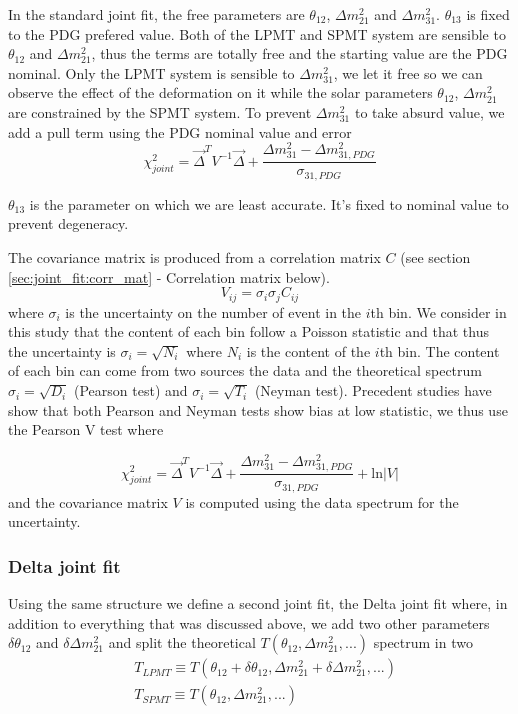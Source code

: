 \documentclass[../main.tex]{subfiles}
\begin{document}
In the standard joint fit, the free parameters are $\theta_{12}$, $\Delta m^2_{21}$ and $\Delta m^2_{31}$. $\theta_{13}$ is fixed to the PDG prefered value. Both of the LPMT and SPMT system are sensible to $\theta_{12}$ and $\Delta m^2_{21}$, thus the terms are totally free and the starting value are the PDG nominal. Only the LPMT system is sensible to $\Delta m^2_{31}$, we let it free so we can observe the effect of the deformation on it while the solar parameters $\theta_{12}$, $\Delta m^2_{21}$ are constrained by the SPMT system. To prevent $\Delta m^2_{31}$ to take absurd value, we add a pull term using the PDG nominal value and error
\begin{equation}
  \chi^2_{joint} = \vec{\Delta}^T V^{-1} \vec{\Delta} + \frac{\Delta m^2_{31} - \Delta m^2_{31,PDG}}{\sigma_{31, PDG}}
\end{equation}

$\theta_{13}$ is the parameter on which we are least accurate. It's fixed to nominal value to prevent degeneracy.

The covariance matrix is produced from a correlation matrix $C$ (see section \ref{sec:joint_fit:corr_mat} - Correlation matrix below).
\begin{equation}
  V_{ij} = \sigma_{i} \sigma_{j} C_{ij}
\end{equation}
where $\sigma_{i}$ is the uncertainty on the number of event in the $i$th bin. We consider in this study that the content of each bin follow a Poisson statistic and that thus the uncertainty is $\sigma_i = \sqrt{N_i}$ where $N_i$ is the content of the $i$th bin. The content of each bin can come from two sources the data and the theoretical spectrum $\sigma_i = \sqrt{D_i}$ (Pearson test) and $\sigma_i = \sqrt{T_i}$ (Neyman test). Precedent studies have show that both Pearson and Neyman tests show bias at low statistic, we thus use the Pearson V test where

\begin{equation}
  \chi^2_{joint} = \vec{\Delta}^T V^{-1} \vec{\Delta} + \frac{\Delta m^2_{31} - \Delta m^2_{31,PDG}}{\sigma_{31, PDG}} + \mathrm{ln} | V |
\end{equation}
and the covariance matrix $V$ is computed using the data spectrum for the uncertainty.

\subsubsection{Delta joint fit}

Using the same structure we define a second joint fit, the Delta joint fit where, in addition to everything that was discussed above, we add two other parameters $\delta \theta_{12}$ and $\delta \Delta m^2_{21}$ and split the theoretical $T(\theta_{12}, \Delta m^2_{21}, ...)$ spectrum in two
\begin{equation}
\begin{split}
           &T_{LPMT} \equiv T(\theta_{12} + \delta \theta_{12}, \Delta m^2_{21} + \delta \Delta m^2_{21}, ...) \\
           &T_{SPMT} \equiv T(\theta_{12}                     , \Delta m^2_{21}                         , ...)
\end{split}
\end{equation}
\end{document}
